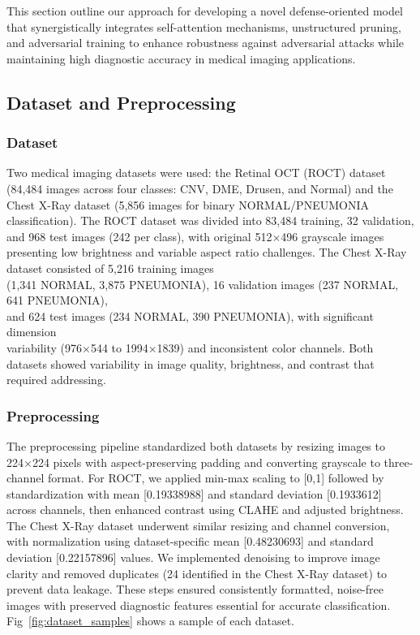 \documentclass[preprint,12pt]{elsarticle}
\begin{document}
This section outline our approach for developing a novel defense-oriented model that synergistically integrates self-attention mechanisms, unstructured pruning, and adversarial training to enhance robustness against adversarial attacks while maintaining high diagnostic accuracy in medical imaging applications.

\subsection{Dataset and Preprocessing}

\subsubsection{Dataset}
Two medical imaging datasets were used: the Retinal OCT (ROCT) dataset (84,484 images across four classes: CNV, DME, Drusen, and Normal) and the Chest X-Ray dataset (5,856 images for binary NORMAL/PNEUMONIA classification). The ROCT dataset was divided into 83,484 training, 32 validation, and 968 test images (242 per class), with original 512×496 grayscale images presenting low brightness and variable aspect ratio challenges. The Chest X-Ray dataset consisted of 5,216 training images \\
(1,341 NORMAL, 3,875 PNEUMONIA), 16 validation images (237 NORMAL, 641 PNEUMONIA), \\
and 624 test images (234 NORMAL, 390 PNEUMONIA), with significant dimension \\
variability (976×544 to 1994×1839) and inconsistent color channels. Both datasets showed variability in image quality, brightness, and contrast that required addressing.

\subsubsection{Preprocessing}
The preprocessing pipeline standardized both datasets by resizing images to 224×224 pixels with aspect-preserving padding and converting grayscale to three-channel format. For ROCT, we applied min-max scaling to [0,1] followed by standardization with mean [0.19338988] and standard deviation [0.1933612] across channels\cite{Elgendi21}, then enhanced contrast using CLAHE and adjusted brightness. The Chest X-Ray dataset underwent similar resizing and channel conversion, with normalization using dataset-specific mean [0.48230693] and standard deviation [0.22157896] values. We implemented denoising to improve image clarity and removed duplicates (24 identified in the Chest X-Ray dataset) to prevent data leakage\cite{Khalifa22}. These steps ensured consistently formatted, noise-free images with preserved diagnostic features essential for accurate classification\cite{Puttagunta21}. Fig~\ref{fig:dataset_samples} shows a sample of each dataset.
\end{document}
